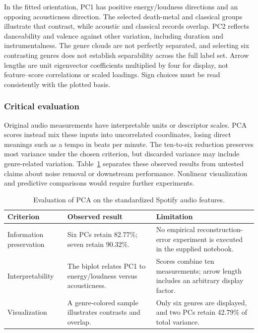 \documentclass[12pt, a4paper]{article}
\begin{document}
In the fitted orientation, PC1 has positive energy/loudness directions and an opposing acousticness direction. The selected death-metal and classical groups illustrate that contrast, while acoustic and classical records overlap. PC2 reflects danceability and valence against other variation, including duration and instrumentalness. The genre clouds are not perfectly separated, and selecting six contrasting genres does not establish separability across the full label set. Arrow lengths are unit eigenvector coefficients multiplied by four for display, not feature--score correlations or scaled loadings. Sign choices must be read consistently with the plotted basis.

\subsubsection{Critical evaluation}
Original audio measurements have interpretable units or descriptor scales. PCA scores instead mix these inputs into uncorrelated coordinates, losing direct meanings such as a tempo in beats per minute. The ten-to-six reduction preserves most variance under the chosen criterion, but discarded variance may include genre-related variation. Table~\ref{tab:spotify-evaluation} separates these observed results from untested claims about noise removal or downstream performance. Nonlinear visualization and predictive comparisons would require further experiments.
\begin{table}[htbp]
\centering\small
\setlength{\tabcolsep}{4pt}\renewcommand{\arraystretch}{1.12}
\caption{Evaluation of PCA on the standardized Spotify audio features.}
\label{tab:spotify-evaluation}
\begin{tabular}{p{.22\linewidth}p{.34\linewidth}p{.34\linewidth}}
\toprule
\raggedright \textbf{Criterion} & \raggedright \textbf{Observed result} & \raggedright \textbf{Limitation} \tabularnewline
\midrule
\raggedright Information preservation & \raggedright Six PCs retain 82.77\%; seven retain 90.32\%. & \raggedright No empirical reconstruction-error experiment is executed in the supplied notebook. \tabularnewline
\raggedright Interpretability & \raggedright The biplot relates PC1 to energy/loudness versus acousticness. & \raggedright Scores combine ten measurements; arrow length includes an arbitrary display factor. \tabularnewline
\raggedright Visualization & \raggedright A genre-colored sample illustrates contrasts and overlap. & \raggedright Only six genres are displayed, and two PCs retain 42.79\% of total variance. \tabularnewline
\bottomrule
\end{tabular}
\end{table}
\end{document}

